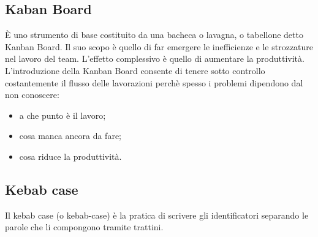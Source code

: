 \documentclass[../glossario.tex]{subfiles}
\begin{document}
\subsection*{Kaban Board}
{}
È uno strumento di base costituito da una bacheca o lavagna, o tabellone detto Kanban Board. Il suo scopo è quello di far emergere le inefficienze e le strozzature nel lavoro del team. L’effetto complessivo è quello di aumentare la produttività. L’introduzione della Kanban Board consente di tenere sotto controllo costantemente il flusso delle lavorazioni perchè spesso i problemi dipendono dal non conoscere:
\begin{itemize}
\item a che punto è il lavoro;
\item cosa manca ancora da fare;
\item cosa riduce la produttività.
\end{itemize}

\subsection*{Kebab case }
{}
Il kebab case (o kebab-case) è la pratica di scrivere gli identificatori separando le parole che li compongono tramite trattini.
\end{document}
